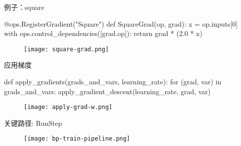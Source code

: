 \begin{frame}[fragile]{例子：square}
  \begin{python}
@ops.RegisterGradient("Square")
def SquareGrad(op, grad):
  x = op.inputs[0]
  with ops.control_dependencies([grad.op]):
    return grad * (2.0 * x)
  \end{python}

  \begin{figure}
    \centering
    \texttt{[image: square-grad.png]}
  \end{figure}
\end{frame}

\begin{frame}[fragile]{应用梯度}
  \begin{python} 
def apply_gradients(grads_and_vars, learning_rate):
  for (grad, var) in grads_and_vars:
    apply_gradient_descent(learning_rate, grad, var)
  \end{python}
  \begin{figure}
    \centering
    \texttt{[image: apply-grad-w.png]}
  \end{figure}  
\end{frame}

\begin{frame}{关键路径: RunStep}
  \begin{figure}
    \centering
    \texttt{[image: bp-train-pipeline.png]}
  \end{figure}
\end{frame}
